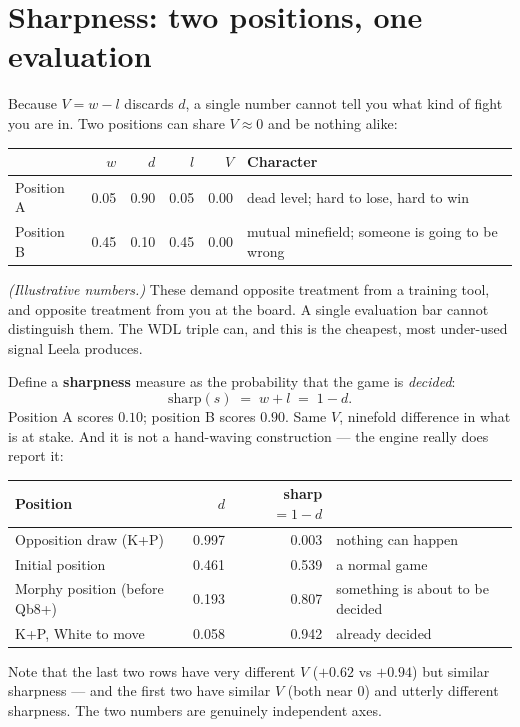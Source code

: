 \section{Sharpness: two positions, one evaluation}

Because $V = w - l$ discards $d$, a single number cannot tell you what kind of fight you are
in. Two positions can share $V \approx 0$ and be nothing alike:

\begin{center}
\begin{tabular}{@{}lrrrrl@{}}
\toprule
 & $w$ & $d$ & $l$ & $V$ & Character \\
\midrule
Position A & 0.05 & 0.90 & 0.05 & $0.00$ & dead level; hard to lose, hard to win \\
Position B & 0.45 & 0.10 & 0.45 & $0.00$ & mutual minefield; someone is going to be wrong \\
\bottomrule
\end{tabular}
\end{center}

\emph{(Illustrative numbers.)} These demand opposite treatment from a training tool, and
opposite treatment from you at the board. A single evaluation bar cannot distinguish them.
The WDL triple can, and this is the cheapest, most under-used signal Leela produces.

Define a \textbf{sharpness} measure as the probability that the game is \emph{decided}:
\begin{equation}
  \label{eq:sharpness}
  \text{sharp}(s) \;=\; w + l \;=\; 1 - d .
\end{equation}
Position A scores $0.10$; position B scores $0.90$. Same $V$, ninefold difference in what is
at stake. And it is not a hand-waving construction --- the engine really does report it:

\begin{realdata}[title={Real engine output: draw probability separates the positions}]
\begin{center}
\begin{tabular}{@{}lrrl@{}}
\toprule
Position & $d$ & sharp $= 1-d$ & \\
\midrule
Opposition draw (K+P)           & 0.997 & 0.003 & nothing can happen \\
Initial position                & 0.461 & 0.539 & a normal game \\
Morphy position (before Qb8+)   & 0.193 & 0.807 & something is about to be decided \\
K+P, White to move              & 0.058 & 0.942 & already decided \\
\bottomrule
\end{tabular}
\end{center}
Note that the last two rows have very different $V$ ($+0.62$ vs $+0.94$) but similar
sharpness --- and the first two have similar $V$ (both near $0$) and utterly different
sharpness. The two numbers are genuinely independent axes.
\end{realdata}


